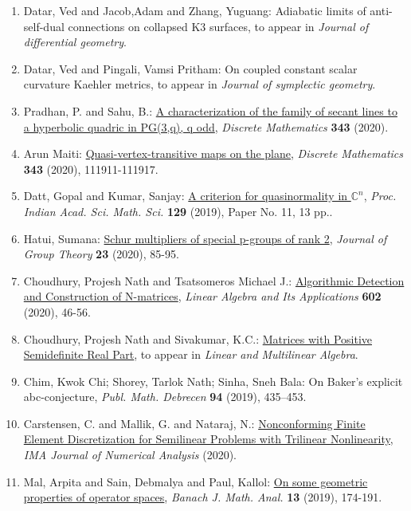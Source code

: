 \begin{enumerate}
\item Datar, Ved and Jacob,Adam and Zhang, Yuguang: Adiabatic limits of anti-self-dual connections on collapsed K3 surfaces, to appear in \emph{Journal of differential geometry}.
\item Datar, Ved and Pingali, Vamsi Pritham: On coupled constant scalar curvature Kaehler metrics, to appear in \emph{Journal of symplectic geometry}.
\item Pradhan, P. and Sahu, B.: \href{https://doi.org/10.1016/j.disc.2020.112044}{A characterization of the family of secant lines to a hyperbolic quadric in PG(3,q), q odd}, \emph{Discrete Mathematics} {\bf 343} (2020).
\item Arun Maiti: \href{https://www.sciencedirect.com/science/article/pii/S0012365X20301035}{Quasi-vertex-transitive maps on the plane}, \emph{Discrete Mathematics} {\bf 343} (2020), 111911-111917.
\item Datt, Gopal and Kumar, Sanjay: \href{https://link.springer.com/article/10.1007/s12044-018-0449-5?shared-article-renderer}{A criterion for quasinormality in $\mathbb{C}^n$}, \emph{Proc. Indian Acad. Sci. Math. Sci.} {\bf 129} (2019), Paper No. 11, 13 pp..
\item Hatui, Sumana: \href{https://www.degruyter.com/view/journals/jgth/23/1/article-p85.xml}{Schur multipliers of special p-groups of rank 2}, \emph{Journal of Group Theory} {\bf 23} (2020), 85-95.
\item Choudhury, Projesh Nath and Tsatsomeros Michael J.: \href{https://doi.org/10.1016/j.laa.2020.04.028}{Algorithmic Detection and Construction of N-matrices}, \emph{Linear Algebra and Its Applications} {\bf 602} (2020), 46-56.
\item Choudhury, Projesh Nath and Sivakumar, K.C.: \href{https://doi.org/10.1080/03081087.2019.1602588}{Matrices with Positive Semidefinite Real Part}, to appear in \emph{Linear and Multilinear Algebra}.
\item Chim, Kwok Chi; Shorey, Tarlok Nath; Sinha, Sneh Bala: On Baker's explicit abc-conjecture, \emph{Publ. Math. Debrecen} {\bf 94} (2019), 435–453.
\item Carstensen, C. and Mallik, G. and Nataraj, N.: \href{https://doi.org/10.1093/imanum/drz071}{Nonconforming Finite Element Discretization for Semilinear Problems with Trilinear Nonlinearity}, \emph{IMA Journal of Numerical Analysis} {\bf } (2020).
\item Mal, Arpita and Sain, Debmalya and Paul, Kallol: \href{https://projecteuclid.org/euclid.bjma/1543914019}{On some geometric properties of operator spaces}, \emph{Banach J. Math. Anal.} {\bf 13} (2019), 174-191.

\end{enumerate}
